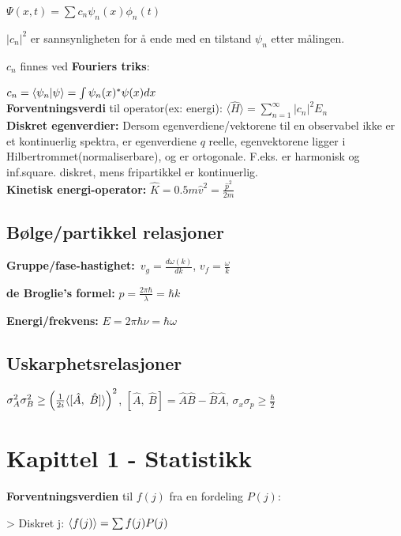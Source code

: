 \documentclass[10p,a4paper]{article}
\begin{document}
$\Psi(x,t) = \sum c_n \psi_n(x) \phi_n(t)$

$|c_n|^2$ er sannsynligheten for å ende med en tilstand $\psi_n$ etter målingen.

$c_n$ finnes ved \textbf{Fouriers triks}:

$c_n = \bra{\psi_n}\ket{\psi} = \int \psi_n(x)^* \psi(x) dx$
\\

\textbf{Forventningsverdi} til operator(ex: energi): $\langle \hat{H} \rangle = \sum\limits_{n=1}^\infty |c_n|^2E_n$
\\

\textbf{Diskret egenverdier:} Dersom egenverdiene/vektorene til en observabel ikke er et kontinuerlig spektra, er egenverdiene $q$ reelle, egenvektorene ligger i Hilbertrommet(normaliserbare), og er ortogonale. F.eks. er harmonisk og inf.square. diskret, mens fripartikkel er kontinuerlig.
\\

\textbf{Kinetisk energi-operator:} $\hat{K} = 0.5m\hat{v}^2 = \frac{\hat{p}^2}{2m}$



\subsection*{Bølge/partikkel relasjoner}

\textbf{Gruppe/fase-hastighet:} $v_g = \frac{d\omega(k)}{dk}$, $v_f = \frac{\omega}{k}$

\textbf{de Broglie's formel:} $p = \frac{2\pi\hbar}{\lambda} = \hbar k$

\textbf{Energi/frekvens:} $E = 2\pi\hbar\nu = \hbar\omega$


\subsection*{Uskarphetsrelasjoner}
$\sigma_A^2\sigma_B^2 \geq \qty(\frac{1}{2i}\langle [\hat{A},\ \hat{B}]\rangle )^2$,
\quad $[\hat{A},\ \hat{B}] = \hat{A}\hat{B} - \hat{B}\hat{A}$, \quad $\sigma_x\sigma_p \geq \frac{\hbar}{2}$



\section*{Kapittel 1 - Statistikk}

\textbf{Forventningsverdien} til $f(j)$ fra en fordeling $P(j)$:

> Diskret j: $\expval{f(j)} = \sum f(j) P(j)$
\end{document}
